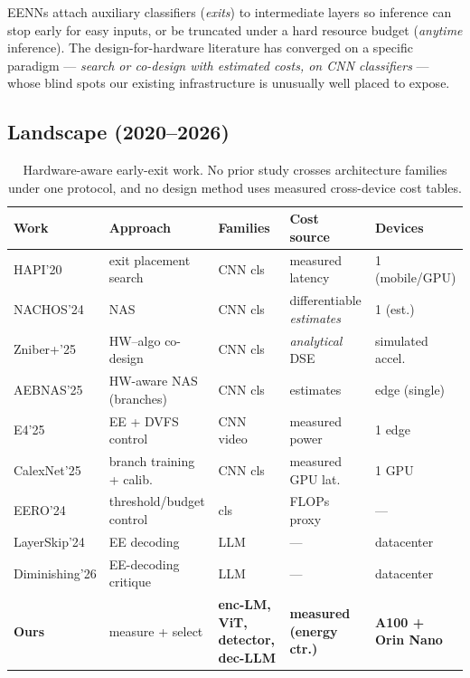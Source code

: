 \documentclass[11pt]{article}
\begin{document}
EENNs attach auxiliary classifiers (\emph{exits}) to intermediate layers so
inference can stop early for easy inputs, or be truncated under a hard
resource budget (\emph{anytime} inference). The design-for-hardware literature
has converged on a specific paradigm --- \emph{search or co-design with
estimated costs, on CNN classifiers} --- whose blind spots our existing
infrastructure is unusually well placed to expose.

\subsection{Landscape (2020--2026)}

\begin{table}[h]
\centering\scriptsize
\begin{tabular}{lllll}
\toprule
Work & Approach & Families & Cost source & Devices\\
\midrule
HAPI'20 \citep{hapi2020} & exit placement search & CNN cls & measured latency & 1 (mobile/GPU)\\
NACHOS'24 \citep{nachos2024} & NAS & CNN cls & differentiable \emph{estimates} & 1 (est.)\\
Zniber+'25 \citep{zniber2025} & HW--algo co-design & CNN cls & \emph{analytical} DSE & simulated accel.\\
AEBNAS'25 \citep{aebnas2025} & HW-aware NAS (branches) & CNN cls & estimates & edge (single)\\
E4'25 \citep{e42025} & EE + DVFS control & CNN video & measured power & 1 edge\\
CalexNet'25 \citep{calexnet2025} & branch training + calib. & CNN cls & measured GPU lat. & 1 GPU\\
EERO'24 \citep{eero2024} & threshold/budget control & cls & FLOPs proxy & ---\\
LayerSkip'24 \citep{layerskip2024} & EE decoding & LLM & --- & datacenter\\
Diminishing'26 \citep{diminishing2026} & EE-decoding critique & LLM & --- & datacenter\\
\textbf{Ours} & measure + select & \textbf{enc-LM, ViT, detector, dec-LLM} & \textbf{measured (energy ctr.)} & \textbf{A100 + Orin Nano}\\
\bottomrule
\end{tabular}
\caption{Hardware-aware early-exit work. No prior study crosses architecture
families under one protocol, and no design method uses measured cross-device
cost tables.}
\end{table}
\end{document}
